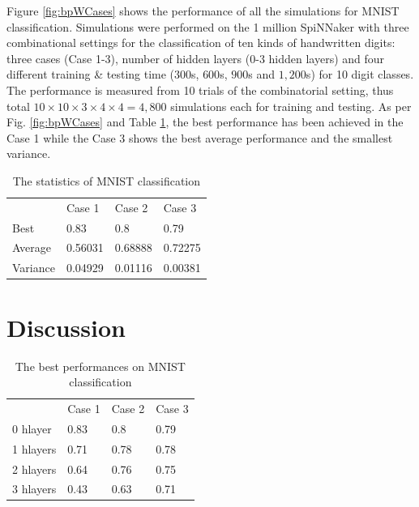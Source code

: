 \documentclass{article}
\begin{document}
Figure \ref{fig:bpWCases} shows the performance of all the simulations for MNIST classification.
Simulations were performed on the 1 million SpiNNaker \cite{brown2018spinnaker} with three combinational settings for the classification of ten kinds of handwritten digits: three cases (Case 1-3), number of hidden layers (0-3 hidden layers) and four different training \& testing time ($300$s, $600$s, $900$s and $1,200$s) for 10 digit classes. 
The performance is measured from 10 trials of the combinatorial setting, thus total $10 \times 10 \times 3 \times 4 \times 4 = 4,800$ simulations each for training and testing. 
As per Fig. \ref{fig:bpWCases} and Table \ref{tab:sim_stat}, the best performance has been achieved in the Case 1 while the Case 3 shows the best average performance and the smallest variance. 

\setlength{\tabcolsep}{4pt}
\begin{table}
\setlength{\tabcolsep}{12pt} %
\begin{center}
\caption{The statistics of MNIST classification}
\label{tab:sim_stat}
\begin{tabular}{ llll }
\hline\noalign{\smallskip}
     ~          & Case 1    & Case 2    & Case 3    \\ 
\noalign{\smallskip}
\hline
\noalign{\smallskip}    
    Best 	    & 0.83	    & 0.8 	    & 0.79      \\ %
    Average 	& 0.56031	& 0.68888 	& 0.72275   \\ %
    Variance 	& 0.04929	& 0.01116	& 0.00381   \\ %
\hline
\end{tabular}
\end{center}
\end{table}
\setlength{\tabcolsep}{1.4pt}

\section{Discussion}
% 

\setlength{\tabcolsep}{4pt}
\begin{table}
\setlength{\tabcolsep}{12pt} %
\begin{center}
\caption{The best performances on MNIST classification}
\label{tab:sim_best}
\begin{tabular}{ llll }
\hline\noalign{\smallskip}
     ~          & Case 1    & Case 2    & Case 3    \\ 
\noalign{\smallskip}
\hline
\noalign{\smallskip}    
    0 hlayer 	& 0.83	    & 0.8	    & 0.79   \\
    1 hlayers 	& 0.71  	& 0.78   	& 0.78   \\
    2 hlayers	& 0.64  	& 0.76  	& 0.75   \\
    3 hlayers 	& 0.43  	& 0.63  	& 0.71   \\
\hline
\end{tabular}
\end{center}
\end{table}
\setlength{\tabcolsep}{1.4pt}
\end{document}
